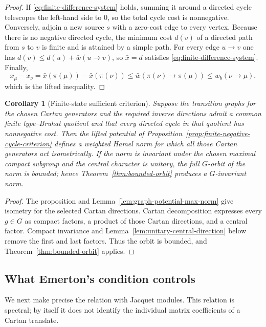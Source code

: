 \documentclass[12pt]{article}
\newtheorem{corollary}[theorem]{Corollary}
\theoremstyle{definition}
\theoremstyle{remark}
\begin{document}
\begin{proof}
If \eqref{eq:finite-difference-system} holds, summing it around a directed
cycle telescopes the left-hand side to $0$, so the total cycle cost is
nonnegative.  Conversely, adjoin a new source $s$ with a zero-cost edge to
every vertex.  Because there is no negative directed cycle, the minimum cost
$d(v)$ of a directed path from $s$ to $v$ is finite and is attained by a
simple path.  For every edge $u\to v$ one has
$d(v)\leq d(u)+\bar w(u\to v)$, so $\bar x=d$ satisfies
\eqref{eq:finite-difference-system}.  Finally,
\[
 x_\mu-x_\nu
 =\bar x(\pi(\mu))-\bar x(\pi(\nu))
 \leq\bar w(\pi(\nu)\to\pi(\mu))
 \leq w_b(\nu\to\mu),
\]
which is the lifted inequality.
\end{proof}

\begin{corollary}[Finite-state sufficient criterion]
\label{cor:finite-state-Cartan-sufficient}
Suppose the transition graphs for the chosen Cartan generators and the
required inverse directions admit a common finite type--Bruhat quotient and
that every directed cycle in that quotient has nonnegative cost.  Then the
lifted potential of Proposition~\ref{prop:finite-negative-cycle-criterion}
defines a weighted Hamel norm for which all those Cartan generators act
isometrically.  If the norm is invariant under the chosen maximal compact
subgroup and the central character is unitary, the full $G$-orbit of the
norm is bounded; hence Theorem~\ref{thm:bounded-orbit} produces a
$G$-invariant norm.
\end{corollary}

\begin{proof}
The proposition and Lemma~\ref{lem:graph-potential-max-norm} give
isometry for the selected Cartan directions.  Cartan decomposition expresses
every $g\in G$ as compact factors, a product of those Cartan directions, and
a central factor.  Compact invariance and Lemma~\ref{lem:unitary-central-direction}
below remove the first and last factors.  Thus the orbit is bounded, and
Theorem~\ref{thm:bounded-orbit} applies.
\end{proof}

\subsection{What Emerton's condition controls}

We next make precise the relation with Jacquet modules.  This relation is
spectral; by itself it does not identify the individual matrix coefficients
of a Cartan translate.
\end{document}
